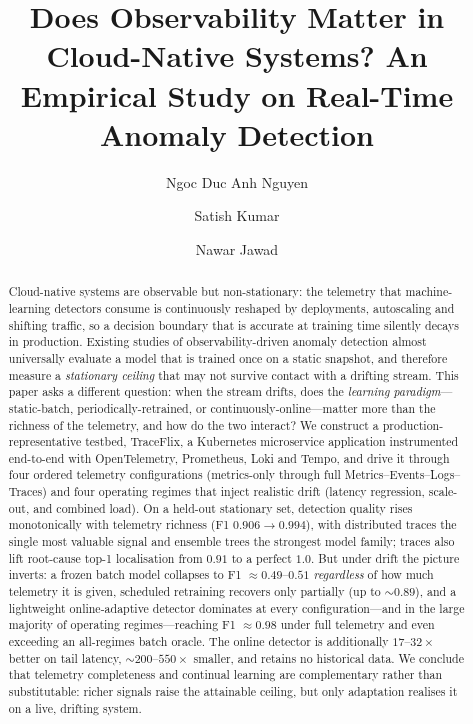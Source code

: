 \documentclass[acmsmall]{acmart}
\begin{document}
\title{Does Observability Matter in Cloud-Native Systems? An Empirical Study on Real-Time Anomaly Detection}

\author{Ngoc Duc Anh Nguyen}

\author{Satish Kumar}

\author{Nawar Jawad}

\renewcommand{\shortauthors}{Nguyen et al.}

\begin{abstract}
Cloud-native systems are observable but non-stationary: the telemetry that machine-learning detectors consume is continuously reshaped by deployments, autoscaling and shifting traffic, so a decision boundary that is accurate at training time silently decays in production. Existing studies of observability-driven anomaly detection almost universally evaluate a model that is trained once on a static snapshot, and therefore measure a \emph{stationary ceiling} that may not survive contact with a drifting stream. This paper asks a different question: when the stream drifts, does the \emph{learning paradigm}---static-batch, periodically-retrained, or continuously-online---matter more than the richness of the telemetry, and how do the two interact? We construct a production-representative testbed, TraceFlix, a Kubernetes microservice application instrumented end-to-end with OpenTelemetry, Prometheus, Loki and Tempo, and drive it through four ordered telemetry configurations (metrics-only through full Metrics--Events--Logs--Traces) and four operating regimes that inject realistic drift (latency regression, scale-out, and combined load). On a held-out stationary set, detection quality rises monotonically with telemetry richness (F1 $0.906 \rightarrow 0.994$), with distributed traces the single most valuable signal and ensemble trees the strongest model family; traces also lift root-cause top-1 localisation from $0.91$ to a perfect $1.0$. But under drift the picture inverts: a frozen batch model collapses to F1 $\approx 0.49$--$0.51$ \emph{regardless} of how much telemetry it is given, scheduled retraining recovers only partially (up to $\sim 0.89$), and a lightweight online-adaptive detector dominates at every configuration---and in the large majority of operating regimes---reaching F1 $\approx 0.98$ under full telemetry and even exceeding an all-regimes batch oracle. The online detector is additionally $17$--$32\times$ better on tail latency, $\sim 200$--$550\times$ smaller, and retains no historical data. We conclude that telemetry completeness and continual learning are complementary rather than substitutable: richer signals raise the attainable ceiling, but only adaptation realises it on a live, drifting system.
\end{abstract}
\end{document}
